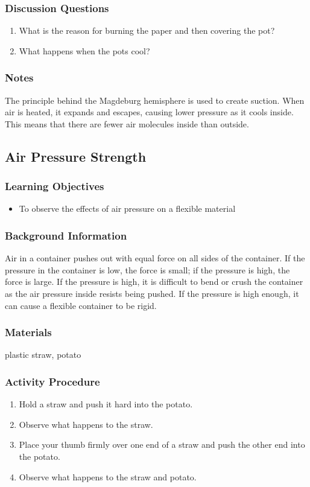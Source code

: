\subsubsection*{Discussion Questions}
\begin{enumerate}
\item{What is the reason for burning the paper and then covering the pot?}
\item{What happens when the pots cool?}
\end{enumerate}

\subsubsection*{Notes}
The principle behind the Magdeburg hemisphere is used to create suction. When air is heated, it expands and escapes, causing lower pressure as it cools inside. This means that there are fewer air molecules inside than outside. 

\subsection{Air Pressure Strength}

\subsubsection*{Learning Objectives}
\begin{itemize}
\item{To observe the effects of air pressure on a flexible material}
\end{itemize}

\subsubsection*{Background Information}
Air in a container pushes out with equal force on all sides of the container. If the pressure in the container is low, the force is small; if the pressure is high, the force is large. If the pressure is high, it is difficult to bend or crush the container as the air pressure inside resists being pushed. If the pressure is high enough, it can cause a flexible container to be rigid.

\subsubsection*{Materials}
plastic straw, potato

\subsubsection*{Activity Procedure}
\begin{enumerate}
\item{Hold a straw and push it hard into the potato.}
\item{Observe what happens to the straw.}
\item{Place your thumb firmly over one end of a straw and push the other end into the potato.}
\item{Observe what happens to the straw and potato.}
\end{enumerate}

